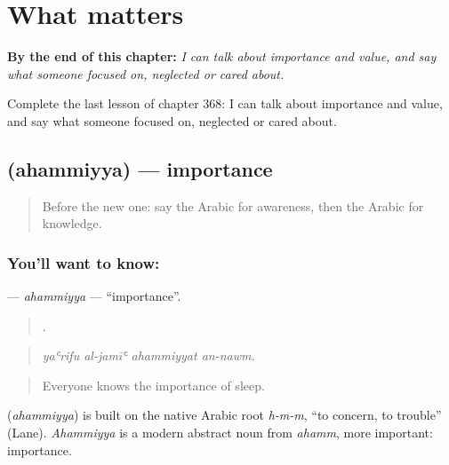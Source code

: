 
\chapter{What matters}
\label{ch:ar-what-matters}

\begin{chapteropening}
\textbf{By the end of this chapter:} \emph{I can talk about importance and value, and say what someone focused on, neglected or cared about.}

Complete the last lesson of chapter 368: I can talk about importance and value, and say what someone focused on, neglected or cared about.
\end{chapteropening}

\section[\texorpdfstring{\ar{أهمية} (ahammiyya)}{أهمية (ahammiyya)}]{ (ahammiyya) — importance}

\label{lesson:AR-C368-ahammiyya}



\begin{quote}
Before the new one: say the Arabic for awareness, then the Arabic for knowledge.
\end{quote}

\subsection*{You'll want to know: }
\textbf{} — \emph{ahammiyya} — \textquotedblleft{}importance\textquotedblright{}.

\begin{quote}
   .
\end{quote}

\begin{quote}
\emph{yaʿrifu al-jamīʿ ahammiyyat an-nawm.}
\end{quote}

\begin{quote}
Everyone knows the importance of sleep.
\end{quote}

\begin{cousinweb}
\textbf{} (\emph{ahammiyya}) is built on the native Arabic root \emph{h-m-m}, \textquotedblleft{}to concern, to trouble\textquotedblright{} (Lane). \emph{Ahammiyya} is a modern abstract noun from \emph{ahamm}, more important: importance.
\end{cousinweb}

